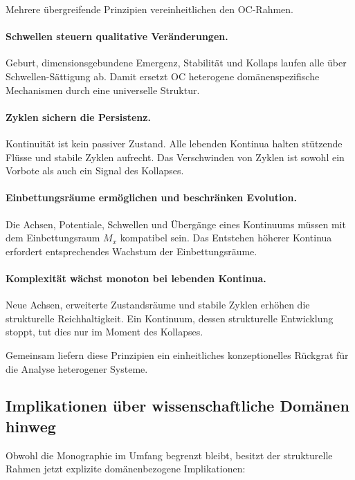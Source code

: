 Mehrere übergreifende Prinzipien vereinheitlichen den OC-Rahmen.

\paragraph{Schwellen steuern qualitative Veränderungen.}
Geburt, dimensionsgebundene Emergenz, Stabilität und Kollaps laufen alle über
Schwellen-Sättigung ab.
Damit ersetzt OC heterogene domänenspezifische Mechanismen durch eine
universelle Struktur.

\paragraph{Zyklen sichern die Persistenz.}
Kontinuität ist kein passiver Zustand.
Alle lebenden Kontinua halten stützende Flüsse und stabile Zyklen aufrecht.
Das Verschwinden von Zyklen ist sowohl ein Vorbote als auch ein Signal des
Kollapses.

\paragraph{Einbettungsräume ermöglichen und beschränken Evolution.}
Die Achsen, Potentiale, Schwellen und Übergänge eines Kontinuums müssen mit dem
Einbettungsraum \(M_x\) kompatibel sein.
Das Entstehen höherer Kontinua erfordert entsprechendes Wachstum der
Einbettungsräume.

\paragraph{Komplexität wächst monoton bei lebenden Kontinua.}
Neue Achsen, erweiterte Zustandsräume und stabile Zyklen erhöhen die
strukturelle Reichhaltigkeit.
Ein Kontinuum, dessen strukturelle Entwicklung stoppt, tut dies nur im Moment
des Kollapses.

Gemeinsam liefern diese Prinzipien ein einheitliches konzeptionelles Rückgrat für
die Analyse heterogener Systeme.

\subsection{Implikationen über wissenschaftliche Domänen hinweg}

Obwohl die Monographie im Umfang begrenzt bleibt, besitzt der strukturelle
Rahmen jetzt explizite domänenbezogene Implikationen:

